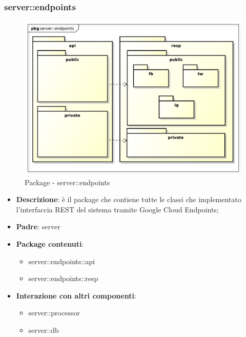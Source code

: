 


\subsubsection{server::endpoints} %
\label{ssub:bdsm_app_server_endpoints}
\begin{figure}[!htbp]
	\centering
	\centerline{\includegraphics[scale=0.6]{./images/server/endpoints.pdf}}
	\caption{Package - server::endpoints}
\end{figure}
\begin{itemize}
  \item \textbf{Descrizione}: è il package che contiene tutte le classi che implementato l'interfaccia REST del sistema tramite Google Cloud Endpoints;
  \item \textbf{Padre}: server
  \item \textbf{Package contenuti}:
  	\begin{itemize}
  		\item server::endpoints::api
  		\item server::endpoints::resp
	\end{itemize}
  \item \textbf{Interazione con altri componenti}:
  	\begin{itemize}
  		\item server::processor
  		\item server::db
	\end{itemize}
\end{itemize}

